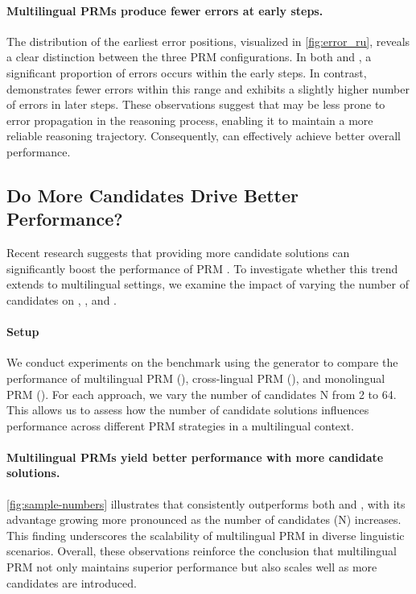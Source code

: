 \paragraph{Multilingual PRMs produce fewer errors at early steps.}

The distribution of the earliest error positions, visualized in \autoref{fig:error_ru}, reveals a clear distinction between the three PRM configurations. In both \mono and \en, a significant proportion of errors occurs within the early steps. In contrast, \mix demonstrates fewer errors within this range and exhibits a slightly higher number of errors in later steps. These observations suggest that \mix may be less prone to error propagation in the reasoning process, enabling it to maintain a more reliable reasoning trajectory. Consequently, \mix can effectively achieve better overall performance.

\subsection{Do More Candidates Drive Better Performance?}
\label{sec:analysis_samplecounts}
Recent research suggests that providing more candidate solutions can significantly boost the performance of PRM \citep{prm800k,shepherd,openr}. To investigate whether this trend extends to multilingual settings, we examine the impact of varying the number of candidates on \mono, \en, and \mix.

\paragraph{Setup}
We conduct experiments on the \mathset benchmark using the \llama generator to compare the performance of multilingual PRM (\mix), cross-lingual PRM (\en), and monolingual PRM (\mono). For each approach, we vary the number of candidates N from 2 to 64. This allows us to assess how the number of candidate solutions influences performance across different PRM strategies in a multilingual context.




\paragraph{Multilingual PRMs yield better performance with more candidate solutions.}

\autoref{fig:sample-numbers} illustrates that \mix consistently outperforms both \en and \mono, with its advantage growing more pronounced as the number of candidates (N) increases. This finding underscores the scalability of multilingual PRM in diverse linguistic scenarios. 
Overall, these observations reinforce the conclusion that multilingual PRM not only maintains superior performance but also scales well as more candidates are introduced.



